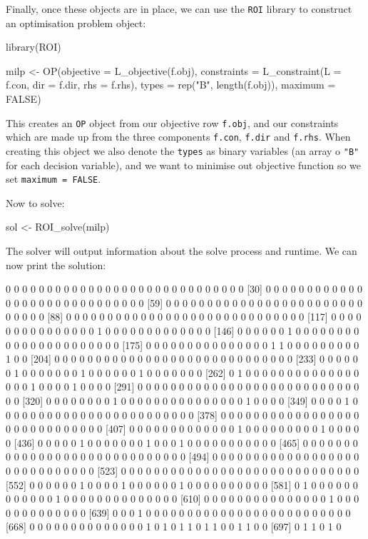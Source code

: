 Finally, once these objects are in place, we can use the \texttt{ROI} library to construct an optimisation problem object:

\begin{Rin}
library(ROI)

milp <- OP(objective = L_objective(f.obj),
           constraints = L_constraint(L = f.con,
                                      dir = f.dir,
                                      rhs = f.rhs),
           types = rep("B", length(f.obj)), 
           maximum = FALSE)
\end{Rin}

This creates an \texttt{OP} object from our objective row \texttt{f.obj}, and our constraints which are made up from the three components \texttt{f.con}, \texttt{f.dir} and \texttt{f.rhs}.
When creating this object we also denote the \texttt{types} as binary variables (an array o \texttt{"B"} for each decision variable), and we want to minimise out objective function so we set \texttt{maximum = FALSE}.

Now to solve:

\begin{Rin}
sol <- ROI_solve(milp)
\end{Rin}

The solver will output information about the solve process and runtime.
We can now print the solution:


\begin{Rout}
  [1] 0 0 0 0 0 0 0 0 0 0 0 0 0 0 0 0 0 0 0 0 0 0 0 0 0 0 0 0 0
 [30] 0 0 0 0 0 0 0 0 0 0 0 0 0 0 0 0 0 0 0 0 0 0 0 0 0 0 0 0 0
 [59] 0 0 0 0 0 0 0 0 0 0 0 0 0 0 0 0 0 0 0 0 0 0 0 0 0 0 0 0 0
 [88] 0 0 0 0 0 0 0 0 0 0 0 0 0 0 0 0 0 0 0 0 0 0 0 0 0 0 0 0 0
[117] 0 0 0 0 0 0 0 0 0 0 0 0 0 0 0 1 0 0 0 0 0 0 0 0 0 0 0 0 0
[146] 0 0 0 0 0 0 1 0 0 0 0 0 0 0 0 0 0 0 0 0 0 0 0 0 0 0 0 0 0
[175] 0 0 0 0 0 0 0 0 0 0 0 0 0 0 0 1 1 0 0 0 0 0 0 0 0 0 1 0 0
[204] 0 0 0 0 0 0 0 0 0 0 0 0 0 0 0 0 0 0 0 0 0 0 0 0 0 0 0 0 0
[233] 0 0 0 0 0 0 1 0 0 0 0 0 0 0 1 0 0 0 0 0 0 1 0 0 0 0 0 0 0
[262] 0 1 0 0 0 0 0 0 0 0 0 0 0 0 0 0 0 0 0 1 0 0 0 0 1 0 0 0 0
[291] 0 0 0 0 0 0 0 0 0 0 0 0 0 0 0 0 0 0 0 0 0 0 0 0 0 0 0 0 0
[320] 0 0 0 0 0 0 0 0 1 0 0 0 0 0 0 0 0 0 0 0 0 0 0 0 1 0 0 0 0
[349] 0 0 0 0 1 0 0 0 0 0 0 0 0 0 0 0 0 0 0 0 0 0 0 0 0 0 0 0 0
[378] 0 0 0 0 0 0 0 0 0 0 0 0 0 0 0 0 0 0 0 0 0 0 0 0 0 0 0 0 0
[407] 0 0 0 0 0 0 0 0 0 0 0 0 0 1 0 0 0 0 0 0 0 0 0 1 0 0 0 0 0
[436] 0 0 0 0 0 1 0 0 0 0 0 0 0 1 0 0 0 1 0 0 0 0 0 0 0 0 0 0 0
[465] 0 0 0 0 0 0 0 0 0 0 0 0 0 0 0 0 0 0 0 0 0 0 0 0 0 0 0 0 0
[494] 0 0 0 0 0 0 0 0 0 0 0 0 0 0 0 0 0 0 0 0 0 0 0 0 0 0 0 0 0
[523] 0 0 0 0 0 0 0 0 0 0 0 0 0 0 0 0 0 0 0 0 0 0 0 0 0 0 0 0 0
[552] 0 0 0 0 0 0 1 0 0 0 0 1 0 0 0 0 0 0 1 0 0 0 0 0 0 0 0 0 0
[581] 0 1 0 0 0 0 0 0 0 0 0 0 0 0 1 0 0 0 0 0 0 0 0 0 0 0 0 0 0
[610] 0 0 0 0 0 0 0 0 0 0 0 0 0 0 0 1 0 0 0 0 0 0 0 0 0 0 0 0 0
[639] 0 0 0 1 0 0 0 0 0 0 0 0 0 0 0 0 0 0 0 0 0 0 0 0 0 0 0 0 0
[668] 0 0 0 0 0 0 0 0 0 0 0 0 0 0 1 0 1 0 1 1 0 1 1 0 0 1 1 0 0
[697] 0 1 1 0 1 0
\end{Rout}

